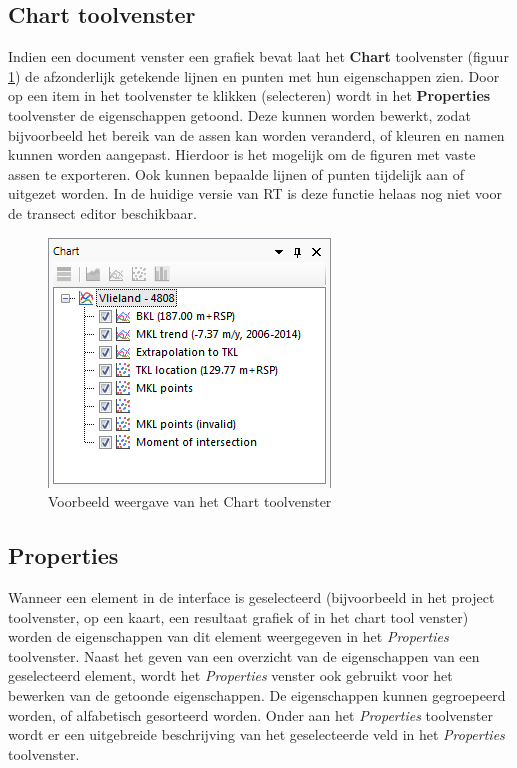 \subsection{Chart toolvenster}
	\label{RT_Chart_Contents}
Indien een document venster een grafiek bevat laat het \textbf{Chart} toolvenster (figuur \ref{fig:3_Chart_Contents}) de afzonderlijk getekende lijnen en punten met hun eigenschappen zien. Door op een item in het toolvenster te klikken (selecteren) wordt in het \textbf{Properties} toolvenster de eigenschappen getoond. Deze kunnen worden bewerkt, zodat bijvoorbeeld het bereik van de assen kan worden veranderd, of kleuren en namen kunnen worden aangepast. Hierdoor is het mogelijk om de figuren met vaste assen te exporteren. Ook kunnen bepaalde lijnen of punten tijdelijk aan of uitgezet worden. In de huidige versie van RT is deze functie helaas nog niet voor de transect editor beschikbaar.

\begin{figure}[H]
	\centering
		\includegraphics{figures/chapter_general/Chart_Contents.png}
		\caption{Voorbeeld weergave van het Chart toolvenster}
	\label{fig:3_Chart_Contents}
\end{figure}

\subsection{Properties}
Wanneer een element in de interface is geselecteerd (bijvoorbeeld in het project toolvenster, op een kaart, een resultaat grafiek of in het chart tool venster) worden de eigenschappen van dit element weergegeven in het \textit{Properties} toolvenster. Naast het geven van een overzicht van de eigenschappen van een geselecteerd element, wordt het \textit{Properties} venster ook gebruikt voor het bewerken van de getoonde eigenschappen.
De eigenschappen kunnen gegroepeerd worden, of alfabetisch gesorteerd worden.
Onder aan het \textit{Properties} toolvenster wordt er een uitgebreide beschrijving van het geselecteerde veld in het \textit{Properties} toolvenster.

